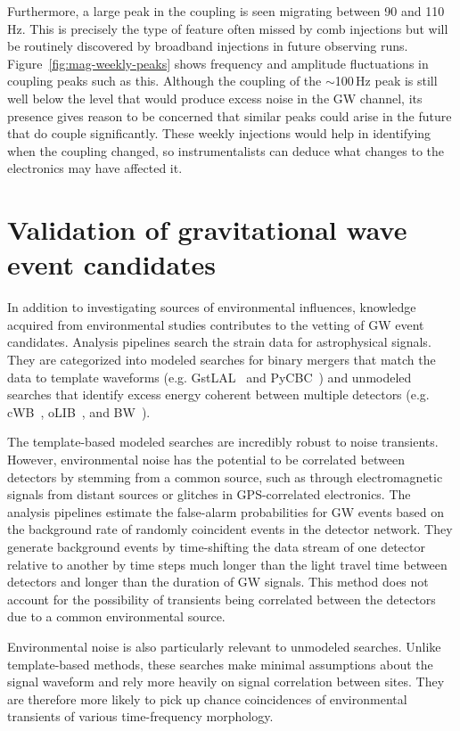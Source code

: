 Furthermore, a large peak in the coupling is seen migrating between 90 and 110\,Hz.
This is precisely the type of feature often missed by comb injections but will be routinely discovered by broadband injections in future observing runs.
Figure~\ref{fig:mag-weekly-peaks} shows frequency and amplitude fluctuations in coupling peaks such as this.
Although the coupling of the $\sim$100\,Hz peak is still well below the level that would produce excess noise in the \ac{GW} channel, its presence gives reason to be concerned that similar peaks could arise in the future that do couple significantly.
These weekly injections would help in identifying when the coupling changed, so instrumentalists can deduce what changes to the electronics may have affected it.

\section{Validation of gravitational wave event candidates}\label{sec:vetting}

In addition to investigating sources of environmental influences, knowledge acquired from environmental studies contributes to the vetting of \ac{GW} event candidates.
Analysis pipelines search the strain data for astrophysical signals.
They are categorized into modeled searches for binary mergers that match the data to template waveforms (e.g. GstLAL~\citep{Cannon_2012} and PyCBC~\citep{Usman_2016}) and unmodeled searches that identify excess energy coherent between multiple detectors (e.g. cWB~\citep{Klimenko_2008}, oLIB~\citep{Lynch_2017}, and BW~\citep{Cornish_2015}).

The template-based modeled searches are incredibly robust to noise transients.
However, environmental noise has the potential to be correlated between detectors by stemming from a common source, such as through electromagnetic signals from distant sources or glitches in GPS-correlated electronics.
The analysis pipelines estimate the false-alarm probabilities for \ac{GW} events based on the background rate of randomly coincident events in the detector network.
They generate background events by time-shifting the data stream of one detector relative to another by time steps much longer than the light travel time between detectors and longer than the duration of \ac{GW} signals.%
This method does not account for the possibility of transients being correlated between the detectors due to a common environmental source.

Environmental noise is also particularly relevant to unmodeled searches. Unlike template-based methods, these searches make minimal assumptions about the signal waveform and rely more heavily on signal correlation between sites.
They are therefore more likely to pick up chance coincidences of environmental transients of various time-frequency morphology.

